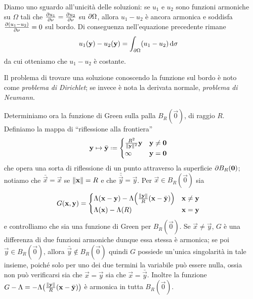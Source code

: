 Diamo uno sguardo all'unicità delle soluzioni: se $u_1$ e $u_2$ sono funzioni armoniche su $\Omega$ tali che $\frac{\partial {u_1}}{\partial {\nu}}=\frac{\partial {u_2}}{\partial {\nu}}$ su $\partial\Omega$, allora $u_1-u_2$ è ancora armonica e soddisfa $\frac{\partial {(u_1-u_2)}}{\partial {\nu}}=0$ sul bordo.
Di conseguenza nell'equazione precedente rimane
\begin{equation}
    u_1(\mathbf{y})-u_2(\mathbf{y})=\int_{\partial\Omega}(u_1-u_2)\,\textup{d}\sigma
\end{equation}
da cui otteniamo che $u_1-u_2$ è costante.

Il problema di trovare una soluzione conoscendo la funzione sul bordo è noto come \emph{problema di Dirichlet}; se invece è nota la derivata normale, \emph{problema di Neumann}.

Determiniamo ora la funzione di Green sulla palla $B_R(\vec 0)$, di raggio $R$.
Definiamo la mappa di ``riflessione alla frontiera''
\begin{equation}
    \vec y\mapsto\bar{\vec y}\defeq
    \begin{cases}
        \frac{R^2}{\norm{\vec y}^2}\vec y & \vec y\ne\vec 0\\
        \infty                            & \vec y=\vec 0
    \end{cases}
    \label{eq:riflessione-frontiera}
\end{equation}
che opera una sorta di riflessione di un punto attraverso la superficie $\partial B_R(\mathbf{0})$; notiamo che $\bar{\vec x}=\vec x$ se $\lVert\mathbf{x}\rVert=R$ e che $\bar{\bar{\vec y}}=\vec y$.
Per $\vec x\in B_R(\vec 0)$ sia
\begin{equation}
    G(\mathbf{x},\mathbf{y})=
    \begin{cases}
        \Lambda(\mathbf{x}-\mathbf{y})-\Lambda\Bigl(\frac{\lVert\mathbf{y}\rVert}{R}(\mathbf{x}-\bar{\mathbf{y}})\Bigr) & \mathbf{x}\ne\mathbf{y}\\
        \Lambda(\mathbf{x})-\Lambda(R)                                                             & \mathbf{x}=\mathbf{y}
    \end{cases}
\end{equation}
e controlliamo che sia una funzione di Green per $B_R(\vec 0)$.
Se $\vec x\ne\vec y$, $G$ è una differenza di due funzioni armoniche dunque essa stessa è armonica; se poi $\vec y\in B_R(\vec 0)$, allora $\bar{\vec y}\notin B_R(\vec 0)$ quindi $G$ possiede un'unica singolarità in tale insieme, poich\'e solo per uno dei due termini la variabile può essere nulla, ossia non può verificarsi sia che $\vec x=\vec y$ sia che $\vec x=\bar{\vec y}$.
Inoltre la funzione $G-\Lambda=-\Lambda\bigl(\frac{\lVert\mathbf{y}\rVert}{R}(\mathbf{x}-\bar{\mathbf{y}})\bigr)$ è armonica in tutta $B_R(\vec 0)$.

